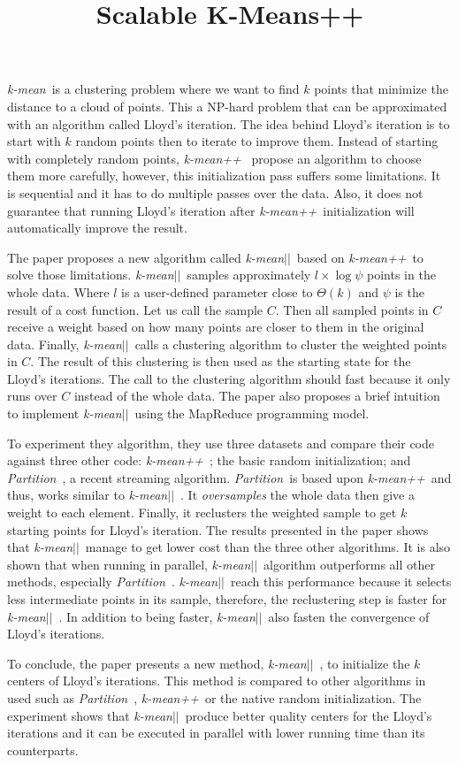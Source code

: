 \documentclass{article}
\title{Scalable K-Means++}
\newcommand{\kmean}{\textit{k-mean}~}
\newcommand{\kmeanpp}{\textit{k-mean++}~}
\newcommand{\km}{\textit{k-mean$\vert\vert$}~}
\newcommand{\partition}{\textit{Partition}~}
\begin{document}
\maketitle
\kmean is a clustering problem where we want to find $k$ points
that minimize the distance to a cloud of points. This a NP-hard problem
that can be approximated with an algorithm called Lloyd’s iteration.
The idea behind Lloyd’s iteration is to start with $k$ random points then to
iterate to improve them. Instead of starting with completely random points, \kmeanpp
propose an algorithm to choose them more carefully, however, this initialization
pass suffers some limitations. It is sequential and it has to do multiple passes over
the data. Also, it does not guarantee that running Lloyd’s iteration after \kmeanpp initialization
will automatically improve the result.

The paper proposes a new algorithm called \km based on \kmeanpp to solve those limitations.
\km samples approximately $l \times \log \psi$ points in the whole data. Where $l$ is a user-defined
parameter close to $\Theta (k)$ and $\psi$ is the result of a cost function. Let us call the sample $C$.
Then all sampled points in $C$ receive a weight based on how many points are closer to them in the original
data. Finally, \km calls a clustering algorithm to cluster the weighted points in $C$. The result of this
clustering is then used as the starting state for the Lloyd's iterations.
The call to the clustering algorithm should fast because it only runs over $C$ instead of the whole data.
The paper also proposes a brief intuition to implement \km using the MapReduce programming model.

To experiment they algorithm, they use three datasets and compare their code against three other code:
\kmeanpp; the basic random initialization; and \partition, a recent streaming algorithm. \partition is based
upon \kmeanpp and thus, works similar to \km. It \textit{oversamples} the whole data then give a weight to
each element. Finally, it reclusters the weighted sample to get $k$ starting points for Lloyd's iteration.
The results presented in the paper shows that \km manage to get lower cost than the three other algorithms.
It is also shown that when running in parallel, \km algorithm outperforms all other methods, especially \partition.
\km reach this performance because it selects less intermediate points in its sample, therefore, the reclustering step is
faster for \km. In addition to being faster, \km also fasten the convergence of Lloyd's iterations.

To conclude, the paper presents a new method, \km, to initialize the $k$ centers of Lloyd's iterations.
This method is compared to other algorithms in used such as \partition, \kmeanpp or the native random initialization.
The experiment shows that \km produce better quality centers for the Lloyd's iterations and it can be executed in parallel
with lower running time than its counterparts.
\end{document}
